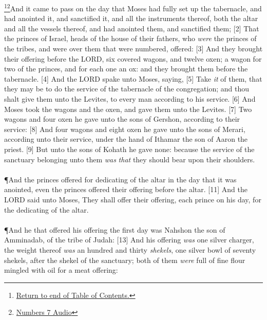 \footnote{\textcolor[cmyk]{0.99998,1,0,0}{\hyperlink{TOC}{Return to end of Table of Contents.}}}\footnote{\href{https://audiobible.com/bible/numbers_7.html}{\textcolor[cmyk]{0.99998,1,0,0}{Numbers 7 Audio}}}\textcolor[cmyk]{0.99998,1,0,0}{And it came to pass on the day that Moses had fully set up the tabernacle, and had anointed it, and sanctified it, and all the instruments thereof, both the altar and all the vessels thereof, and had anointed them, and sanctified them;}
[2] \textcolor[cmyk]{0.99998,1,0,0}{That the princes of Israel, heads of the house of their fathers, who \emph{were} the princes of the tribes, and were over them that were numbered, offered:}
[3] \textcolor[cmyk]{0.99998,1,0,0}{And they brought their offering before the LORD, six covered wagons, and twelve oxen; a wagon for two of the princes, and for each one an ox: and they brought them before the tabernacle.}
[4] \textcolor[cmyk]{0.99998,1,0,0}{And the LORD spake unto Moses, saying,}
[5] \textcolor[cmyk]{0.99998,1,0,0}{Take \emph{it} of them, that they may be to do the service of the tabernacle of the congregation; and thou shalt give them unto the Levites, to every man according to his service.}
[6] \textcolor[cmyk]{0.99998,1,0,0}{And Moses took the wagons and the oxen, and gave them unto the Levites.}
[7] \textcolor[cmyk]{0.99998,1,0,0}{Two wagons and four oxen he gave unto the sons of Gershon, according to their service:}
[8] \textcolor[cmyk]{0.99998,1,0,0}{And four wagons and eight oxen he gave unto the sons of Merari, according unto their service, under the hand of Ithamar the son of Aaron the priest.}
[9] \textcolor[cmyk]{0.99998,1,0,0}{But unto the sons of Kohath he gave none: because the service of the sanctuary belonging unto them \emph{was} \emph{that} they should bear upon their shoulders.}\\
\\
\P \textcolor[cmyk]{0.99998,1,0,0}{And the princes offered for dedicating of the altar in the day that it was anointed, even the princes offered their offering before the altar.}
[11] \textcolor[cmyk]{0.99998,1,0,0}{And the LORD said unto Moses, They shall offer their offering, each prince on his day, for the dedicating of the altar.}\\
\\
\P \textcolor[cmyk]{0.99998,1,0,0}{And he that offered his offering the first day was Nahshon the son of Amminadab, of the tribe of Judah:}
[13] \textcolor[cmyk]{0.99998,1,0,0}{And his offering \emph{was} one silver charger, the weight thereof \emph{was} an hundred and thirty \emph{shekels}, one silver bowl of seventy shekels, after the shekel of the sanctuary; both of them \emph{were} full of fine flour mingled with oil for a meat offering:}
